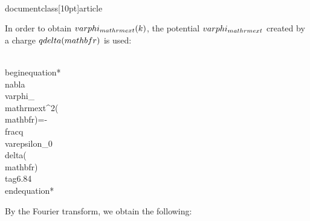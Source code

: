 \\documentclass[10pt]{article}
\begin{document}
{{{{In order to obtain $\\varphi_{\\mathrm{ext}}(k)$, the potential $\\varphi_{\\mathrm{ext}}$ created by a charge $q \\delta(\\mathbf{r})$ is used:


\\begin{equation*}
\\nabla \\varphi_{\\mathrm{ext}}^{2}(\\mathbf{r})=-\\frac{q}{\\varepsilon_{0}} \\delta(\\mathbf{r}) \\tag{6.84}
\\end{equation*}


By the Fourier transform, we obtain the following:


}}}}
\end{document}
